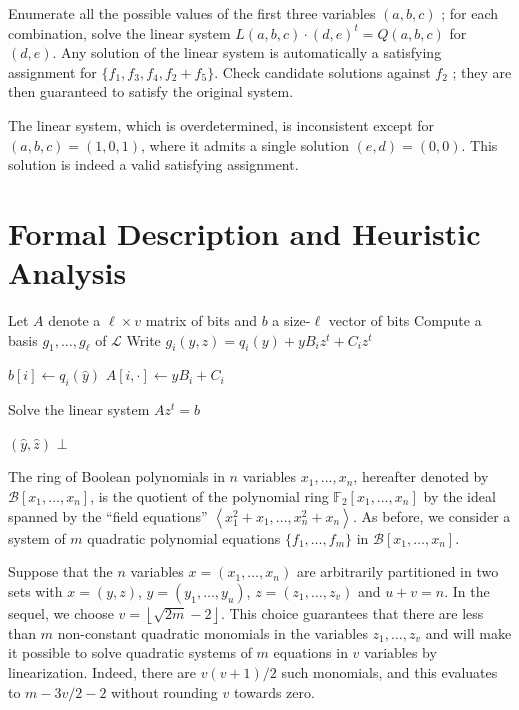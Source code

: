 \documentclass[twoside,leqno]{article}
\newcommand{\bits}{\left\{0, 1\right\}}
\begin{document}
Enumerate all the possible values of the first three variables $(a, b, c)$ ; for
each combination, solve the linear system $L(a,b,c) \cdot (d,e)^t = Q(a,b,c)$
for $(d,e)$. Any solution of the linear system is automatically a satisfying
assignment for $\{f_1, f_3, f_4, f_2 + f_5\}$. Check candidate solutions against
$f_2$ ; they are then guaranteed to satisfy the original system.

The linear system, which is overdetermined, is inconsistent except for
$(a,b,c) = (1,0,1)$, where it admits a single solution $(e, d) = (0, 0)$. This
solution is indeed a valid satisfying assignment.

\section{Formal Description and Heuristic Analysis}
\label{sec:description}

\begin{algorithm}[t]
  \caption{\label{the-algo}}
  \begin{algorithmic}[1]
    \State Let $A$ denote a $\ell \times v$ matrix of bits and $b$ a size-$\ell$
    vector of bits
    \State Compute a basis $g_1, \dots, g_\ell$ of $\mathcal{L}$
    \State Write $g_i(y, z) = q_i(y) + y B_i z^t + C_i  z^t$
    \For{$\hat y \in \bits^u$}
    
    \State $b[i] \gets  q_i(\hat y)$
    \State $A[i, \cdot] \gets \hat y B_i + C_i$
    \EndFor
    
    \State Solve the linear system $Az^t = b$
    
    \State \Return $(\hat y, \hat z)$
    \EndIf
    \EndFor
    \EndFor
    \State \Return $\bot$
  \end{algorithmic}
\end{algorithm}

The ring of Boolean polynomials in $n$ variables $x_1, \dots, x_n$, hereafter
denoted by $\mathcal{B}[x_1, \dots, x_n]$, is the quotient of the polynomial
ring $\mathbb{F}_2[x_1, \dots, x_n]$ by the ideal spanned by the ``field
equations'' $\left\langle x_1^2 + x_1, \dots, x_n^2 + x_n\right\rangle$.  As
before, we consider a system of $m$ quadratic polynomial equations
$\{f_1, \dots, f_m\}$ in $\mathcal{B}[x_1, \dots, x_n]$.

Suppose that the $n$ variables $x = (x_1, \dots, x_n)$ are arbitrarily
partitioned in two sets with $x = (y, z)$, $y = (y_1, \dots, y_{u})$,
$z = (z_1, \dots, z_{v})$ and $u + v = n$. In the sequel, we choose
$v = \left\lfloor \sqrt{2m} - 2 \right\rfloor$. This choice guarantees that
there are less than $m$ non-constant quadratic monomials in the variables
$z_1, \dots, z_v$ and will make it possible to solve quadratic systems of $m$
equations in $v$ variables by linearization. Indeed, there are $v(v+1)/2$ such
monomials, and this evaluates to $m - 3v/2 - 2$ without rounding $v$ towards
zero.
\end{document}
